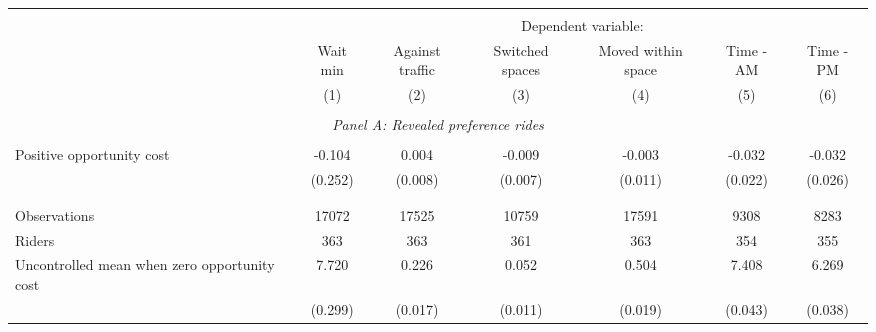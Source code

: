 \begin{tabular}{l*{6}{c}} \hline\hline \\[-1.8ex] & \multicolumn{6}{c}{Dependent variable: } \\ 
                    &\multicolumn{1}{c}{Wait min}&\multicolumn{1}{c}{Against traffic}&\multicolumn{1}{c}{Switched spaces}&\multicolumn{1}{c}{Moved within space}&\multicolumn{1}{c}{Time - AM}&\multicolumn{1}{c}{Time - PM}\\
& (1) & (2)  & (3) & (4) & (5) & (6) \\ \hline \\[-1ex] \multicolumn{7}{c}{\textit{Panel A: Revealed preference rides}} \\\\[-1ex]
Positive opportunity cost&      -0.104         &       0.004         &      -0.009         &      -0.003         &      -0.032         &      -0.032         \\
                    &     (0.252)         &     (0.008)         &     (0.007)         &     (0.011)         &     (0.022)         &     (0.026)         \\
\\[-1.8ex] \hline \\[-1.8ex]  
Observations        &       17072         &       17525         &       10759         &       17591         &        9308         &        8283         \\
Riders              &         363         &         363         &         361         &         363         &         354         &         355         \\
Uncontrolled mean when zero opportunity cost&       7.720         &       0.226         &       0.052         &       0.504         &       7.408         &       6.269         \\
\,                  &     (0.299)         &     (0.017)         &     (0.011)         &     (0.019)         &     (0.043)         &     (0.038)         \\


\end{tabular}
